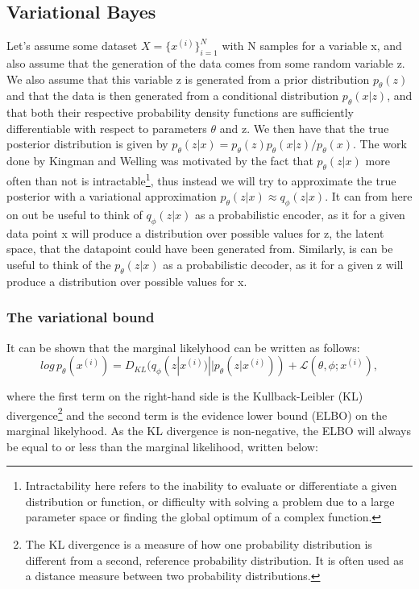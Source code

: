 \subsection*{Variational Bayes}
Let's assume some dataset $X = \{x^{(i)}\}_{i=1}^{N}$ with N samples for a variable x, and also assume that the generation of the data comes from 
some random variable z. We also assume that this variable z is generated from a prior distribution $p_{\theta}(z)$ and that the data is then 
generated from a conditional distribution $p_{\theta}(x|z)$, and that both their respective probability density functions are sufficiently 
differentiable with respect to parameters $\theta$ and z. We then have that the true posterior distribution is given by 
$p_{\theta}(z|x) = p_{\theta}(z)p_{\theta}(x|z)/p_{\theta}(x)$. The work done by Kingman and Welling \cite{VAE} was motivated by the fact that
$p_{\theta}(z|x)$ more often than not is intractable\footnote{Intractability here refers to the inability to evaluate or differentiate 
a given distribution or function, or difficulty with solving a problem due to a large parameter space or finding the global optimum of 
a complex function. }, thus instead we will try to approximate the true posterior with a variational approximation $p_{\theta}(z|x) \approx q_{\phi}(z|x)$.   
It can from here on out be useful to think of $q_{\phi}(z|x)$ as a probabilistic encoder, as it for a given data point x will produce a distribution
over possible values for z, the latent space, that the datapoint could have been generated from. Similarly, is can be useful to think of the   
$p_{\theta}(z|x)$ as a probabilistic decoder, as it for a given z will produce a distribution over possible values for x.

\subsubsection*{The variational bound}
It can be shown that the marginal likelyhood can be written as follows:
\begin{equation}
    log\, p_{\theta}(x^{(i)}) = D_{KL}(q_{\phi}(z|x^{(i)})||p_{\theta}(z|x^{(i)})) + \mathcal{L}(\theta, \phi;x^{(i)}),
\end{equation}

where the first term on the right-hand side is the Kullback-Leibler (KL) divergence\footnote{The KL divergence is a measure of how one 
probability distribution is different from a second, reference probability distribution. It is often used as a distance measure 
between two probability distributions.} and the second term is the evidence lower bound (ELBO) on the marginal likelyhood. 
As the KL divergence is non-negative, the ELBO will always be equal to or less than the marginal likelihood, written below:

